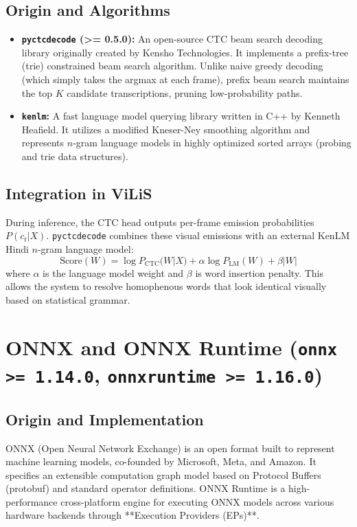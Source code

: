\documentclass[11pt,a4paper]{report}
\begin{document}
\subsection{Origin and Algorithms}
\begin{itemize}
    \item \textbf{\texttt{pyctcdecode} (>= 0.5.0):} An open-source CTC beam search decoding library originally created by Kensho Technologies. It implements a prefix-tree (trie) constrained beam search algorithm. Unlike naive greedy decoding (which simply takes the argmax at each frame), prefix beam search maintains the top $K$ candidate transcriptions, pruning low-probability paths.
    \item \textbf{\texttt{kenlm}:} A fast language model querying library written in C++ by Kenneth Heafield. It utilizes a modified Kneser-Ney smoothing algorithm and represents $n$-gram language models in highly optimized sorted arrays (probing and trie data structures).
\end{itemize}
\subsection{Integration in ViLiS}
During inference, the CTC head outputs per-frame emission probabilities $P(c_t | X)$. \texttt{pyctcdecode} combines these visual emissions with an external KenLM Hindi $n$-gram language model:
$$\text{Score}(W) = \log P_{\text{CTC}}(W | X) + \alpha \log P_{\text{LM}}(W) + \beta |W|$$
where $\alpha$ is the language model weight and $\beta$ is word insertion penalty. This allows the system to resolve homophenous words that look identical visually based on statistical grammar.

\section{ONNX and ONNX Runtime (\texttt{onnx >= 1.14.0}, \texttt{onnxruntime >= 1.16.0})}
\subsection{Origin and Implementation}
ONNX (Open Neural Network Exchange) is an open format built to represent machine learning models, co-founded by Microsoft, Meta, and Amazon. It specifies an extensible computation graph model based on Protocol Buffers (protobuf) and standard operator definitions.
ONNX Runtime is a high-performance cross-platform engine for executing ONNX models across various hardware backends through **Execution Providers (EPs)**.
\end{document}
